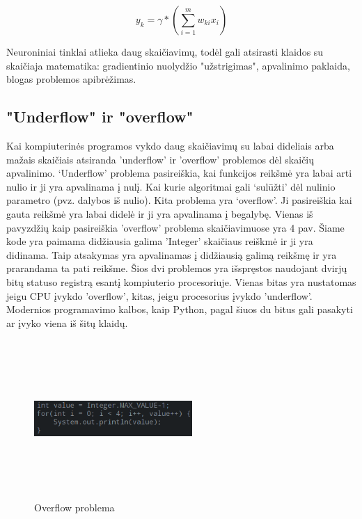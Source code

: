 \documentclass{VUMIFInfKursinis}
\begin{document}
\[
  y_{k} = \gamma * (\sum_{i=1}^{m}w_{ki}x_{i})
\]




Neuroniniai tinklai atlieka daug skaičiavimų, todėl gali atsirasti klaidos su
skaičiaja matematika: gradientinio nuolydžio "užstrigimas", apvalinimo paklaida,
blogas problemos apibrėžimas.









\subsection{"Underflow" ir "overflow"}
\par
Kai kompiuterinės programos vykdo daug skaičiavimų su
labai dideliais arba mažais skaičiais atsiranda 'underflow' ir 'overflow' problemos
dėl skaičių apvalinimo. ‘Underflow’ problema pasireiškia,
kai funkcijos reikšmė yra labai arti nulio ir ji yra apvalinama į nulį. Kai
kurie algoritmai gali ‘sulūžti’ dėl nulinio parametro (pvz. dalybos iš nulio). Kita
problema yra ‘overflow’. Ji pasireiškia kai gauta reikšmė yra labai didelė ir ji yra
apvalinama į begalybę. \cite{salt7} Vienas iš pavyzdžių kaip pasireiškia 'overflow' problema skaičiavimuose
yra 4 pav. Šiame kode yra paimama didžiausia galima 'Integer' skaičiaus reiškmė ir ji
yra didinama. Taip atsakymas yra apvalinamas į didžiausią galimą reikšmę ir
yra prarandama ta pati reikšme. Šios dvi problemos yra išspręstos naudojant dvirjų bitų statuso registrą
esantį kompiuterio procesoriuje. Vienas bitas yra nustatomas jeigu CPU įvykdo 'overflow', kitas, jeigu
procesorius įvykdo 'underflow'. Modernios programavimo kalbos, kaip Python, pagal šiuos du
bitus gali pasakyti ar įvyko viena iš šitų klaidų.

\begin{figure}[ht]
  \includegraphics[width=6cm,height=6cm,keepaspectratio]{code1.png}
  \caption{Overflow problema}
  \label{fig:overflowProblem}
\end{figure}
\end{document}
